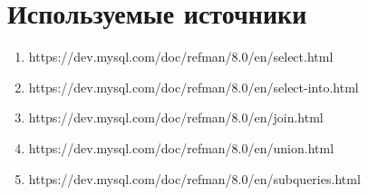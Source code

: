 \documentclass[12pt,a4paper]{article}
\begin{document}
\section{Используемые источники}
\begin{enumerate}
    \item https://dev.mysql.com/doc/refman/8.0/en/select.html
    \item https://dev.mysql.com/doc/refman/8.0/en/select-into.html
    \item https://dev.mysql.com/doc/refman/8.0/en/join.html
    \item https://dev.mysql.com/doc/refman/8.0/en/union.html
    \item https://dev.mysql.com/doc/refman/8.0/en/subqueries.html
\end{enumerate}
\end{document}
